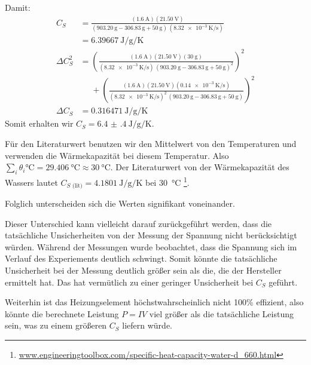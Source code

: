 		Damit:
		\begin{align*}
			C_S &= \frac{(\SI{1.6}{\ampere})(\SI{21.50}{\volt})}{(\SI{903.20}{\gram} - \SI{306.83}{\gram} + \SI{50}{\gram})\,(\SI{8.32e-3}{\kelvin\per\second})} \\
			&= \SI{6.39667}{\joule\per\gram\per\kelvin} \\
			\Delta C_S^2 &= \left(\frac{(\SI{1.6}{\ampere})(\SI{21.50}{\volt}) (\SI{30}{\gram})}{(\SI{8.32e-3}{\kelvin\per\second})\,(\SI{903.20}{\gram} - \SI{306.83}{\gram} + \SI{50}{\gram})^2}\right)^2 \\
			&\phantom{=}+ \left(\frac{(\SI{1.6}{\ampere})(\SI{21.50}{\volt})(\SI{0.14e-3}{\kelvin\per\second})}{(\SI{8.32e-3}{\kelvin\per\second})^2\,(\SI{903.20}{\gram} - \SI{306.83}{\gram} + \SI{50}{\gram})}\right)^2 \\
		\Delta C_S &= \SI{0.316471}{\joule\per\gram\per\kelvin}
		\end{align*}
		Somit erhalten wir $C_S = \SI{6.4(4)}{\joule\per\gram\per\kelvin}$.

		Für den Literaturwert benutzen wir den Mittelwert von den Temperaturen und verwenden die Wärme\-kapazität bei diesem Temperatur. Also $\sum_i \theta_i \si{\celsius} = \SI{29.406}{\celsius} \approx \SI{30}{\celsius}$. Der Literaturwert von der Wärmekapazität des Wassers lautet $C_{S\text{ (lit)}} = \SI{4.1801}{\joule\per\gram\per\kelvin}$ bei \SI{30}{\celsius} \footnote{\url{www.engineeringtoolbox.com/specific-heat-capacity-water-d_660.html}}.

		Folglich unterscheiden sich die Werten signifikant voneinander. 

		Dieser Unterschied kann vielleicht darauf zurückgeführt werden, dass die tatsächliche Unsicherheiten von der Messung der Spannung nicht berücksichtigt würden. Während der Messungen wurde beobachtet, dass die Spannung sich im Verlauf des Experiements deutlich schwingt. Somit könnte die tatsächliche Unsicherheit bei der Messung deutlich größer sein als die, die der Hersteller ermittelt hat. Das hat vermütlich zu einer geringer Unsicherheit bei $C_S$ geführt. 

		Weiterhin ist das Heizungselement höchstwahrscheinlich nicht 100\% effizient, also könnte die berechnete Leistung $P=IV$ viel größer als die tatsächliche Leistung sein, was zu einem größeren $C_S$ liefern würde. 
